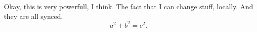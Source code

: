 Okay, this is very powerfull, I think.
The fact that I can change stuff, locally.
And they are all synced.
\[
    a^2+b^2=c^2.
\]
